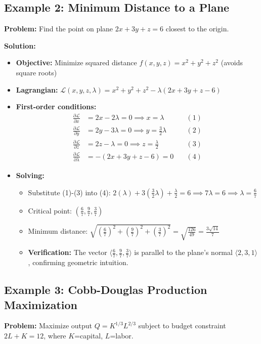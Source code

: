\documentclass{article}
\begin{document}
\subsection*{Example 2: Minimum Distance to a Plane}
\textbf{Problem:} Find the point on plane $2x + 3y + z = 6$ closest to the origin.

\textbf{Solution:}
\begin{itemize}
\item \textbf{Objective:} Minimize squared distance $f(x,y,z) = x^2 + y^2 + z^2$ (avoids square roots)
    \item \textbf{Lagrangian:} $\mathcal{L}(x,y,z,\lambda) = x^2 + y^2 + z^2 - \lambda (2x + 3y + z - 6)$
    \item \textbf{First-order conditions:}
    \[
    \begin{aligned}
    \frac{\partial \mathcal{L}}{\partial x} &= 2x - 2\lambda = 0 \implies x = \lambda \quad &(1)\\
    \frac{\partial \mathcal{L}}{\partial y} &= 2y - 3\lambda = 0 \implies y = \tfrac{3}{2}\lambda \quad &(2)\\
    \frac{\partial \mathcal{L}}{\partial z} &= 2z - \lambda = 0 \implies z = \tfrac{\lambda}{2} \quad &(3)\\
    \frac{\partial \mathcal{L}}{\partial \lambda} &= -(2x + 3y + z - 6) = 0 \quad &(4)
    \end{aligned}
    \]
    \item \textbf{Solving:}
    \begin{itemize}
        \item Substitute (1)-(3) into (4): $2(\lambda) + 3(\tfrac{3}{2}\lambda) + \tfrac{\lambda}{2} = 6 \implies 7\lambda = 6 \implies \lambda = \tfrac{6}{7}$
        \item Critical point: $\left( \tfrac{6}{7}, \tfrac{9}{7}, \tfrac{3}{7} \right)$
        \item Minimum distance: $\sqrt{ \left(\tfrac{6}{7}\right)^2 + \left(\tfrac{9}{7}\right)^2 + \left(\tfrac{3}{7}\right)^2 } = \sqrt{\tfrac{126}{49}} = \tfrac{3\sqrt{14}}{7}$
    \item \textbf{Verification:} The vector $\langle \tfrac{6}{7}, \tfrac{9}{7}, \tfrac{3}{7} \rangle$ is parallel to the plane's normal $\langle 2,3,1 \rangle$, confirming geometric intuition.
\end{itemize}
\end{itemize}

\subsection*{Example 3: Cobb-Douglas Production Maximization}
\textbf{Problem:} Maximize output $Q = K^{1/3} L^{2/3}$ subject to budget constraint $2L + K = 12$, where $K$=capital, $L$=labor.
\end{document}
